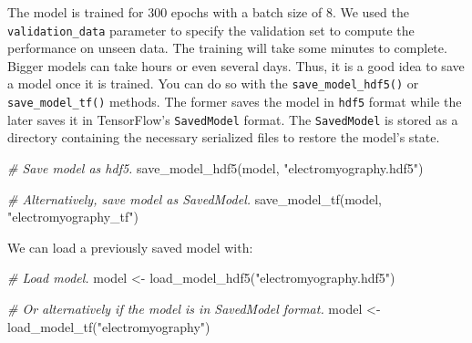 \documentclass[
  11pt,
]{krantz}
\newenvironment{Shaded}{\begin{snugshade}}{\end{snugshade}}
\newcommand{\AttributeTok}[1]{\textcolor[rgb]{0.61,0.61,0.61}{#1}}
\newcommand{\CommentTok}[1]{\textcolor[rgb]{0.37,0.37,0.37}{\textit{#1}}}
\newcommand{\ConstantTok}[1]{\textcolor[rgb]{0,0,0}{#1}}
\newcommand{\DecValTok}[1]{\textcolor[rgb]{0.06,0.06,0.06}{#1}}
\newcommand{\FunctionTok}[1]{\textcolor[rgb]{0,0,0}{#1}}
\newcommand{\NormalTok}[1]{#1}
\newcommand{\OtherTok}[1]{\textcolor[rgb]{0.37,0.37,0.37}{#1}}
\newcommand{\SpecialCharTok}[1]{\textcolor[rgb]{0,0,0}{#1}}
\newcommand{\StringTok}[1]{\textcolor[rgb]{0.5,0.5,0.5}{#1}}
\begin{document}
\begin{Shaded}
\end{Shaded}

The model is trained for \(300\) epochs with a batch size of \(8\). We used the \texttt{validation\_data} parameter to specify the validation set to compute the performance on unseen data. The training will take some minutes to complete. Bigger models can take hours or even several days. Thus, it is a good idea to save a model once it is trained. You can do so with the \texttt{save\_model\_hdf5()} or \texttt{save\_model\_tf()} methods. The former saves the model in \texttt{hdf5} format while the later saves it in TensorFlow's \texttt{SavedModel} format. The \texttt{SavedModel} is stored as a directory containing the necessary serialized files to restore the model's state.

\begin{Shaded}
\begin{Highlighting}[]
\CommentTok{\# Save model as hdf5.}
\FunctionTok{save\_model\_hdf5}\NormalTok{(model, }\StringTok{"electromyography.hdf5"}\NormalTok{)}

\CommentTok{\# Alternatively, save model as SavedModel.}
\FunctionTok{save\_model\_tf}\NormalTok{(model, }\StringTok{"electromyography\_tf"}\NormalTok{)}
\end{Highlighting}
\end{Shaded}

We can load a previously saved model with:

\begin{Shaded}
\begin{Highlighting}[]
\CommentTok{\# Load model.}
\NormalTok{model }\OtherTok{\textless{}{-}} \FunctionTok{load\_model\_hdf5}\NormalTok{(}\StringTok{"electromyography.hdf5"}\NormalTok{)}

\CommentTok{\# Or alternatively if the model is in SavedModel format.}
\NormalTok{model }\OtherTok{\textless{}{-}} \FunctionTok{load\_model\_tf}\NormalTok{(}\StringTok{"electromyography"}\NormalTok{)}
\end{Highlighting}
\end{Shaded}
\end{document}
